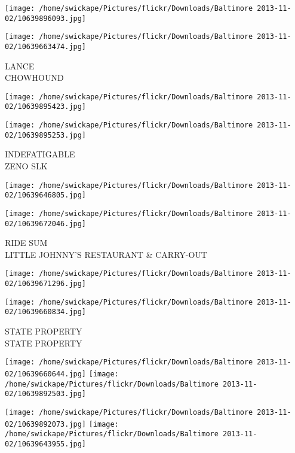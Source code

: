 \documentclass[10pt,letterpaper]{article}
\begin{document}
\texttt{[image: /home/swickape/Pictures/flickr/Downloads/Baltimore 2013-11-02/10639896093.jpg]}

\vspace{0.25in}
\texttt{[image: /home/swickape/Pictures/flickr/Downloads/Baltimore 2013-11-02/10639663474.jpg]}

LANCE\\
CHOWHOUND\\
\pagebreak

\texttt{[image: /home/swickape/Pictures/flickr/Downloads/Baltimore 2013-11-02/10639895423.jpg]}

\vspace{0.25in}
\texttt{[image: /home/swickape/Pictures/flickr/Downloads/Baltimore 2013-11-02/10639895253.jpg]}

INDEFATIGABLE\\
ZENO SLK\\
\pagebreak

\texttt{[image: /home/swickape/Pictures/flickr/Downloads/Baltimore 2013-11-02/10639646805.jpg]}

\vspace{0.25in}
\texttt{[image: /home/swickape/Pictures/flickr/Downloads/Baltimore 2013-11-02/10639672046.jpg]}

RIDE SUM\\
LITTLE JOHNNY'S RESTAURANT \& CARRY{-}OUT\\
\pagebreak

\texttt{[image: /home/swickape/Pictures/flickr/Downloads/Baltimore 2013-11-02/10639671296.jpg]}

\vspace{0.25in}
\texttt{[image: /home/swickape/Pictures/flickr/Downloads/Baltimore 2013-11-02/10639660834.jpg]}

STATE PROPERTY\\
STATE PROPERTY\\
\pagebreak

\texttt{[image: /home/swickape/Pictures/flickr/Downloads/Baltimore 2013-11-02/10639660644.jpg]}
\texttt{[image: /home/swickape/Pictures/flickr/Downloads/Baltimore 2013-11-02/10639892503.jpg]}

\texttt{[image: /home/swickape/Pictures/flickr/Downloads/Baltimore 2013-11-02/10639892073.jpg]}
\texttt{[image: /home/swickape/Pictures/flickr/Downloads/Baltimore 2013-11-02/10639643955.jpg]}
\end{document}
